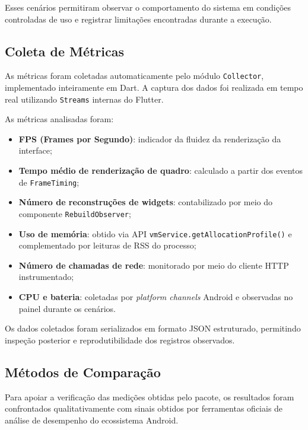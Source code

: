 Esses cenários permitiram observar o comportamento do sistema em condições controladas de uso e registrar limitações encontradas durante a execução.

\subsection{Coleta de Métricas}

As métricas foram coletadas automaticamente pelo módulo \texttt{Collector}, implementado inteiramente em Dart. A captura dos dados foi realizada em tempo real utilizando \texttt{Streams} internas do Flutter.

As métricas analisadas foram:

\begin{itemize}

\item \textbf{FPS (Frames por Segundo)}: indicador da fluidez da renderização da interface;

\item \textbf{Tempo médio de renderização de quadro}: calculado a partir dos eventos de \texttt{FrameTiming};

\item \textbf{Número de reconstruções de widgets}: contabilizado por meio do componente \texttt{RebuildObserver};

\item \textbf{Uso de memória}: obtido via API \texttt{vmService.getAllocationProfile()} e complementado por leituras de RSS do processo;

\item \textbf{Número de chamadas de rede}: monitorado por meio do cliente HTTP instrumentado;

\item \textbf{CPU e bateria}: coletadas por \textit{platform channels} Android e observadas no painel durante os cenários.

\end{itemize}

Os dados coletados foram serializados em formato JSON estruturado, permitindo inspeção posterior e reprodutibilidade dos registros observados.

\subsection{Métodos de Comparação}

Para apoiar a verificação das medições obtidas pelo pacote, os resultados foram confrontados qualitativamente com sinais obtidos por ferramentas oficiais de análise de desempenho do ecossistema Android.

